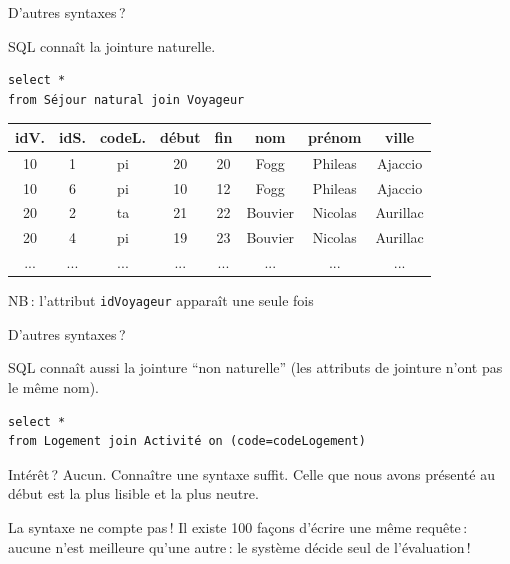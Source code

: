 \begin{frame}[fragile]{D'autres syntaxes\,?}

SQL connaît la jointure naturelle.

\vfill

\begin{verbatim}
select *
from Séjour natural join Voyageur 
\end{verbatim}

\vfill
\begin{footnotesize}
\begin{tabular}{c|c|c|c|c|c|c|c}
\textbf{idV.} & \textbf{idS.} & \textbf{codeL.} & \textbf{début} & \textbf{fin} & \textbf{nom} & \textbf{prénom} & \textbf{ville} \\ \hline 
10 & 1 & pi & 20 & 20 & Fogg & Phileas & Ajaccio \\ \hline 
10 & 6 & pi & 10 & 12 & Fogg & Phileas & Ajaccio \\ \hline 
20 & 2 & ta & 21 & 22 & Bouvier & Nicolas & Aurillac \\ \hline 
20 & 4 & pi & 19 & 23 & Bouvier & Nicolas & Aurillac \\ \hline 
... & ... & ... & ... & ... & ... & ... & ... \\ \hline 
\end{tabular}
\end{footnotesize}

\vfill

NB\,: l'attribut \texttt{idVoyageur} apparaît une seule fois
\end{frame}


\begin{frame}[fragile]{D'autres syntaxes\,?}

SQL connaît aussi la jointure ``non naturelle'' (les attributs
de jointure n'ont pas le même nom).

\vfill

\begin{verbatim}
select *
from Logement join Activité on (code=codeLogement) 
\end{verbatim}

\vfill

\alert{Intérêt}\,? Aucun. Connaître une syntaxe suffit.  Celle
que nous avons présenté au début est la plus lisible et la plus neutre.

\vfill

\begin{remblock}{La syntaxe ne compte pas\,!}
Il existe 100 façons d'écrire une même requête\,: aucune n'est meilleure
qu'une autre\,: le système décide seul
de l'évaluation\,!
\end{remblock}
\end{frame}



